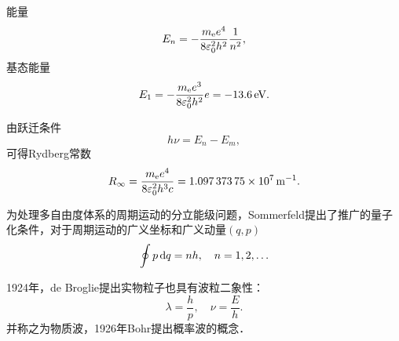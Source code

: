 能量
\begin{align}
	E_n=-\frac{m_\mathrm e e^4}{8\varepsilon_0^2h^2}\frac1{n^2},
\end{align}
基态能量
\[
E_1=-\frac{m_\elc e^3}{8\varepsilon_0^2h^2}e=\SI{-13.6}{\eV}.
\]

由跃迁条件
\[
h\nu=E_n-E_m,
\]
可得Rydberg常数
\[
R_\infty=\frac{m_\elc e^4}{8\varepsilon_0^2h^3c}=\SI{1.09737375e7}{\per\m}.
\]

为处理多自由度体系的周期运动的分立能级问题，Sommerfeld提出了推广的量子化条件，对于周期运动的广义坐标和广义动量$(q,p)$
\begin{align}
	\oint p\mathop{}\!\mathrm{d} q=nh,\quad n=1,2,\ldots
\end{align}

1924年，de Broglie提出实物粒子也具有波粒二象性：
\[
	\lambda=\frac hp,\quad\nu=\frac Eh.
\]
并称之为物质波，1926年Bohr提出概率波的概念．